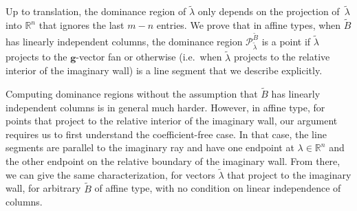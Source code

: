 \documentclass{amsart}
\theoremstyle{definition}
\theoremstyle{remark}
\numberwithin{equation}{section}
\newcommand{\reals}{\mathbb R}
\newcommand{\0}{{\mathbf{0}}}
\newcommand{\g}{\mathbf{g}}
\newcommand{\tB}{{\widetilde{B}}}
\renewcommand{\P}{\mathcal{P}}
\begin{document}
Up to translation, the dominance region of $\tilde\lambda$ only depends on the projection of~$\tilde\lambda$ into $\reals^n$ that ignores the last $m-n$ entries.
We prove that in affine types, when $\tB$ has linearly independent columns, the dominance region $\P_{\tilde\lambda}^\tB$ is a point if $\tilde\lambda$ projects to the $\g$-vector fan or otherwise (i.e.\ when $\tilde\lambda$ projects to the relative interior of the imaginary wall) is a line segment that we describe explicitly.

Computing dominance regions without the assumption that $\tB$ has linearly independent columns is in general much harder. 
However, in affine type, for points that project to the relative interior of the imaginary wall, our argument requires us to first understand the coefficient-free case.
In that case, the line segments are parallel to the imaginary ray and have one endpoint at $\lambda\in\reals^n$ and the other endpoint on the relative boundary of the imaginary wall.
From there, we can give the same characterization, for vectors $\tilde\lambda$ that project to the imaginary wall, for arbitrary $\tB$ of affine type, with no condition on linear independence of columns.

\end{document}
